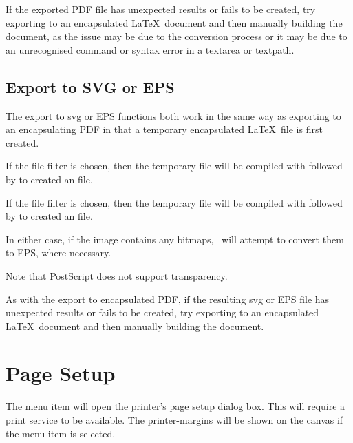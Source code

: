 If the exported PDF file has unexpected results or fails to be
created, try exporting to an encapsulated \LaTeX\ document and then
manually building the document, as the issue may be due to the
conversion process or it may be due to an unrecognised command or
syntax error in a \gls{textarea} or \gls{textpath}.


\subsection{Export to SVG or EPS}\label{sec:exportsvgeps}

The export to \gls{svg} or EPS functions both work in the same way
as \hyperref[sec:exportdoc]{exporting to an encapsulating PDF}
in that a temporary encapsulated \LaTeX\ file is first created.

If the  file filter is chosen, then the temporary
file will be compiled with  followed by
 to created an   file.

If the  file filter is chosen, then the temporary
file will be compiled with  followed by
 to created an  file.

In either case, if the image contains any
\glspl{bitmap}, \FlowframTk\ will attempt to convert
them to EPS, where necessary.

\begin{important}
Note that PostScript does not support transparency.
\end{important}

As with the export to encapsulated PDF, if the resulting \gls{svg} or EPS
file has unexpected results or fails to be created, try exporting to
an encapsulated \LaTeX\ document and then manually building the
document.

\section{Page Setup}\label{sec:pagesetup}


The  menu item will open the printer's page
setup dialog box. This will require a print service to be available.
The \glspl{printer-margin} will be shown on the \gls{canvas} if the
 menu item is selected.

